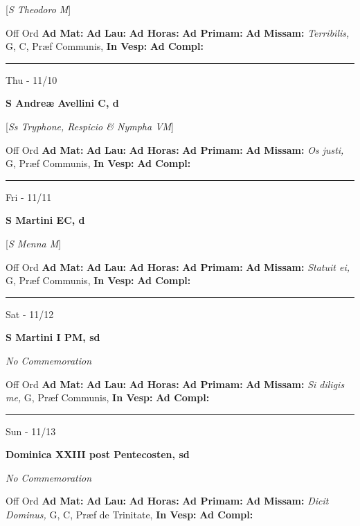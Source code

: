 \documentclass[letterpaper, 10pt]{article}
\begin{document}
[\textit{S Theodoro M}]
\begin{justify}
Off Ord
\textbf{Ad Mat: }
\textbf{Ad Lau: }
\textbf{Ad Horas: }
\textbf{Ad Primam: }
\textbf{Ad Missam:} \textit{Terribilis, } G, C, Præf Communis, 
\textbf{In Vesp: }
\textbf{Ad Compl: }\end{justify}



\hrule
\begin{center}
Thu - 11/10
\end{center}\textbf{ \large S Andreæ Avellini C, \textnormal{\normalsize d}}

[\textit{Ss Tryphone, Respicio \& Nympha VM}]
\begin{justify}
Off Ord
\textbf{Ad Mat: }
\textbf{Ad Lau: }
\textbf{Ad Horas: }
\textbf{Ad Primam: }
\textbf{Ad Missam:} \textit{Os justi, } G, Præf Communis, 
\textbf{In Vesp: }
\textbf{Ad Compl: }\end{justify}



\hrule
\begin{center}
Fri - 11/11
\end{center}\textbf{ \large S Martini  EC, \textnormal{\normalsize d}}

[\textit{S Menna M}]
\begin{justify}
Off Ord
\textbf{Ad Mat: }
\textbf{Ad Lau: }
\textbf{Ad Horas: }
\textbf{Ad Primam: }
\textbf{Ad Missam:} \textit{Statuit ei, } G, Præf Communis, 
\textbf{In Vesp: }
\textbf{Ad Compl: }\end{justify}



\hrule
\begin{center}
Sat - 11/12
\end{center}\textbf{ \large S Martini I PM, \textnormal{\normalsize sd}}

\textit{No Commemoration}\begin{justify}
Off Ord
\textbf{Ad Mat: }
\textbf{Ad Lau: }
\textbf{Ad Horas: }
\textbf{Ad Primam: }
\textbf{Ad Missam:} \textit{Si diligis me, } G, Præf Communis, 
\textbf{In Vesp: }
\textbf{Ad Compl: }\end{justify}



\hrule
\begin{center}
Sun - 11/13
\end{center}\textbf{ \large Dominica XXIII post Pentecosten, \textnormal{\normalsize sd}}

\textit{No Commemoration}\begin{justify}
Off Ord
\textbf{Ad Mat: }
\textbf{Ad Lau: }
\textbf{Ad Horas: }
\textbf{Ad Primam: }
\textbf{Ad Missam:} \textit{Dicit Dominus, } G, C, Præf de Trinitate, 
\textbf{In Vesp: }
\textbf{Ad Compl: }\end{justify}
\end{document}
